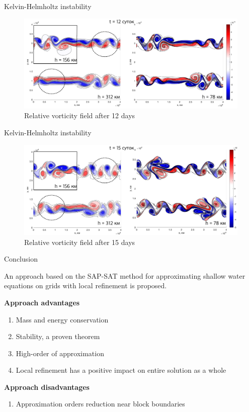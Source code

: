 \documentclass[10pt]{beamer}
\begin{document}
\begin{frame}{Kelvin-Helmholtz instability}
\begin{figure}[h]
\centering
\includegraphics[width=1\linewidth]{./images/kelhelm12.png}
\caption{Relative vorticity field after 12 days}
\label{fig:mpr}
\end{figure}
\end{frame}

\begin{frame}{Kelvin-Helmholtz instability}
\begin{figure}[h]
\centering
\includegraphics[width=1\linewidth]{./images/kelhelm15.png}
\caption{Relative vorticity field after 15 days}
\label{fig:mpr}
\end{figure}
\end{frame}


\begin{frame}{Conclusion}

An approach based on the SAP-SAT method for approximating shallow water equations on grids with local refinement is proposed.

\textbf{Approach advantages}
\begin{enumerate}
\item Mass and energy conservation
\item Stability, a proven theorem
\item High-order of approximation
\item Local refinement has a positive impact on entire solution as a whole
\end{enumerate}

\textbf{Approach disadvantages}
\begin{enumerate}

\item Approximation orders reduction near block boundaries
\end{enumerate}

\end{frame}
\end{document}
